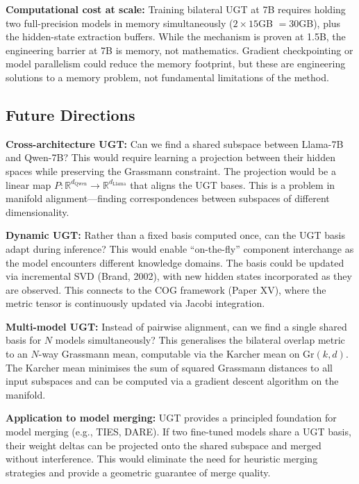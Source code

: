 \documentclass[11pt,a4paper]{article}
\begin{document}
\textbf{Computational cost at scale:} Training bilateral UGT at 7B requires holding two full-precision models in memory simultaneously ($2 \times 15$GB $= 30$GB), plus the hidden-state extraction buffers. While the mechanism is proven at 1.5B, the engineering barrier at 7B is memory, not mathematics. Gradient checkpointing or model parallelism could reduce the memory footprint, but these are engineering solutions to a memory problem, not fundamental limitations of the method.

\subsection{Future Directions}

\textbf{Cross-architecture UGT:} Can we find a shared subspace between Llama-7B and Qwen-7B? This would require learning a projection between their hidden spaces while preserving the Grassmann constraint. The projection would be a linear map $P: \mathbb{R}^{d_{\mathrm{Qwen}}} \rightarrow \mathbb{R}^{d_{\mathrm{Llama}}}$ that aligns the UGT bases. This is a problem in manifold alignment---finding correspondences between subspaces of different dimensionality.

\textbf{Dynamic UGT:} Rather than a fixed basis computed once, can the UGT basis adapt during inference? This would enable ``on-the-fly'' component interchange as the model encounters different knowledge domains. The basis could be updated via incremental SVD (Brand, 2002), with new hidden states incorporated as they are observed. This connects to the COG framework (Paper XV), where the metric tensor is continuously updated via Jacobi integration.

\textbf{Multi-model UGT:} Instead of pairwise alignment, can we find a single shared basis for $N$ models simultaneously? This generalises the bilateral overlap metric to an $N$-way Grassmann mean, computable via the Karcher mean on $\mathrm{Gr}(k,d)$. The Karcher mean minimises the sum of squared Grassmann distances to all input subspaces and can be computed via a gradient descent algorithm on the manifold.

\textbf{Application to model merging:} UGT provides a principled foundation for model merging (e.g., TIES, DARE). If two fine-tuned models share a UGT basis, their weight deltas can be projected onto the shared subspace and merged without interference. This would eliminate the need for heuristic merging strategies and provide a geometric guarantee of merge quality.
\end{document}
